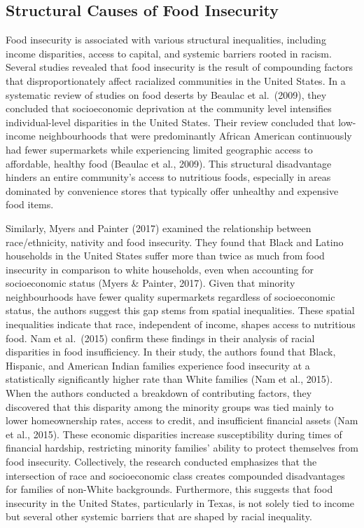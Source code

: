 \documentclass[
]{article}
\begin{document}
\subsection{Structural Causes of Food
Insecurity}\label{structural-causes-of-food-insecurity}

Food insecurity is associated with various structural inequalities,
including income disparities, access to capital, and systemic barriers
rooted in racism. Several studies revealed that food insecurity is the
result of compounding factors that disproportionately affect racialized
communities in the United States. In a systematic review of studies on
food deserts by Beaulac et al.~(2009), they concluded that socioeconomic
deprivation at the community level intensifies individual-level
disparities in the United States. Their review concluded that low-income
neighbourhoods that were predominantly African American continuously had
fewer supermarkets while experiencing limited geographic access to
affordable, healthy food (Beaulac et al., 2009). This structural
disadvantage hinders an entire community's access to nutritious foods,
especially in areas dominated by convenience stores that typically offer
unhealthy and expensive food items.

Similarly, Myers and Painter (2017) examined the relationship between
race/ethnicity, nativity and food insecurity. They found that Black and
Latino households in the United States suffer more than twice as much
from food insecurity in comparison to white households, even when
accounting for socioeconomic status (Myers \& Painter, 2017). Given that
minority neighbourhoods have fewer quality supermarkets regardless of
socioeconomic status, the authors suggest this gap stems from spatial
inequalities. These spatial inequalities indicate that race, independent
of income, shapes access to nutritious food. Nam et al.~(2015) confirm
these findings in their analysis of racial disparities in food
insufficiency. In their study, the authors found that Black, Hispanic,
and American Indian families experience food insecurity at a
statistically significantly higher rate than White families (Nam et al.,
2015). When the authors conducted a breakdown of contributing factors,
they discovered that this disparity among the minority groups was tied
mainly to lower homeownership rates, access to credit, and insufficient
financial assets (Nam et al., 2015). These economic disparities increase
susceptibility during times of financial hardship, restricting minority
families' ability to protect themselves from food insecurity.
Collectively, the research conducted emphasizes that the intersection of
race and socioeconomic class creates compounded disadvantages for
families of non-White backgrounds. Furthermore, this suggests that food
insecurity in the United States, particularly in Texas, is not solely
tied to income but several other systemic barriers that are shaped by
racial inequality.
\end{document}
